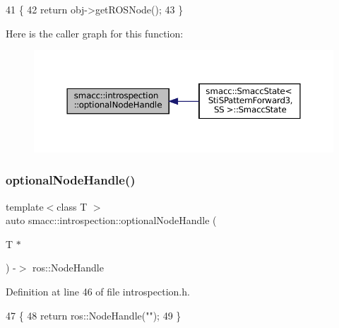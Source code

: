 \begin{DoxyCode}
41 \{
42     \textcolor{keywordflow}{return} obj->getROSNode();
43 \}
\end{DoxyCode}
Here is the caller graph for this function\+:
\nopagebreak
\begin{figure}[H]
\begin{center}
\leavevmode
\includegraphics[width=350pt]{namespacesmacc_1_1introspection_a8acc3b4146a8b2bb0a9fa4178840e9b9_icgraph}
\end{center}
\end{figure}
\mbox{\label{namespacesmacc_1_1introspection_a96b953e65af67591266e9ae4b3e4ee49}} 
\subsubsection{\texorpdfstring{optional\+Node\+Handle()}{optionalNodeHandle()}\hspace{0.1cm}{\footnotesize\ttfamily [2/2]}}
{\footnotesize\ttfamily template$<$class T $>$ \\
auto smacc\+::introspection\+::optional\+Node\+Handle (\begin{DoxyParamCaption}\item[{T $\ast$}]{ }\end{DoxyParamCaption}) -\/$>$ ros\+::\+Node\+Handle
}



Definition at line 46 of file introspection.\+h.


\begin{DoxyCode}
47 \{
48     \textcolor{keywordflow}{return} ros::NodeHandle(\textcolor{stringliteral}{""});
49 \}
\end{DoxyCode}
\mbox{\label{namespacesmacc_1_1introspection_a2911e2897a4572095bc9e7bc75e3a728}} 

